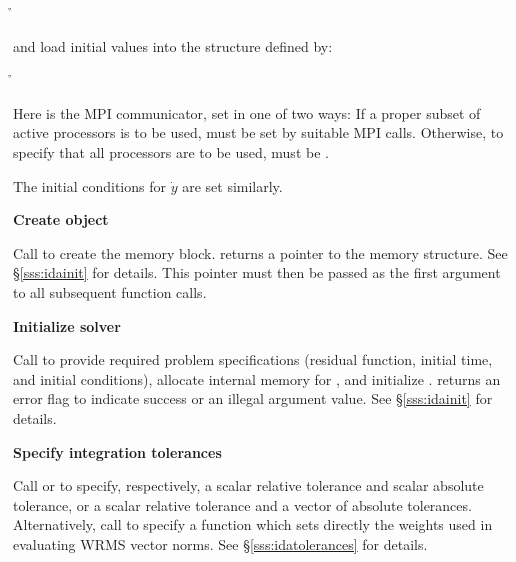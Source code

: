 \begin{Steps}
  {\p} 

  {\h} 

  and load initial values into the structure defined by:

  {\s} 

  {\omp} 

  {\pt} 

  {\p} 

  {\h} 

  Here  is the MPI communicator, set in one of two ways: 
  If a proper subset of active processors is to be used,  
  must be set by suitable MPI calls. Otherwise, to specify that all 
  processors are to be used,  must be .
  
  The initial conditions for $\dot{y}$ are set similarly.

\item\label{i:ida_create} 
  {\bf Create {\idas} object}

  Call \id{()} 
  to create the {\idas} memory block.
   returns a pointer to the {\idas} memory structure.
  See \S\ref{sss:idainit} for details.
  This  pointer must then be passed as the first argument
  to all subsequent {\idas} function calls.

\item\label{i:ida_init} 
  {\bf Initialize {\idas} solver}

  Call  to provide required problem
  specifications (residual function, initial time, and initial conditions),
  allocate internal memory for {\idas}, and initialize {\idas}.
   returns an error flag to indicate success or an illegal argument
  value.  See \S\ref{sss:idainit} for details.
  
\item
  {\bf Specify integration tolerances}

  Call  or 
  to specify, respectively, a scalar relative tolerance and scalar
  absolute tolerance, or a scalar relative tolerance and a vector of
  absolute tolerances.  Alternatively, call  to
  specify a function which sets directly the weights used in
  evaluating WRMS vector norms.  See \S\ref{sss:idatolerances} for
  details.


\end{Steps}

